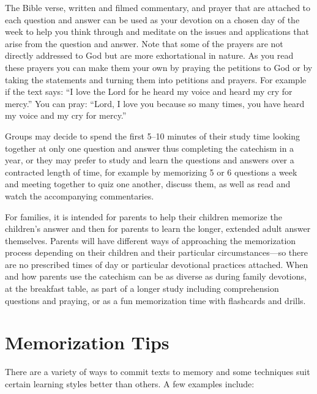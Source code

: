\documentclass[]{memoir}
\begin{document}
The Bible verse, written and filmed commentary, and prayer that are attached to each question and answer can be used as your devotion on a chosen day of the week to help you think through and meditate on the issues and applications that arise from the question and answer. Note that some of the prayers are not directly addressed to God but are more exhortational in nature. As you read these prayers you can make them your own by praying the petitions to God or by taking the statements and turning them into petitions and prayers. For example if the text says: ``I love the Lord for he heard my voice and heard my cry for mercy.'' You can pray: ``Lord, I love you because so many times, you have heard my voice and my cry for mercy.''

Groups may decide to spend the first 5--10 minutes of their study time looking together at only one question and answer thus completing the catechism in a year, or they may prefer to study and learn the questions and answers over a contracted length of time, for example by memorizing 5 or 6 questions a week and meeting together to quiz one another, discuss them, as well as read and watch the accompanying commentaries.

For families, it is intended for parents to help their children memorize the children's answer and then for parents to learn the longer, extended adult answer themselves. Parents will have different ways of approaching the memorization process depending on their children and their particular circumstances\thinspace{}---\thinspace{}so there are no prescribed times of day or particular devotional practices attached. When and how parents use the catechism can be as diverse as during family devotions, at the breakfast table, as part of a longer study including comprehension questions and praying, or as a fun memorization time with flashcards and drills.

\section{Memorization Tips}
There are a variety of ways to commit texts to memory and some techniques suit certain learning styles better than others. A few examples include:
\end{document}

